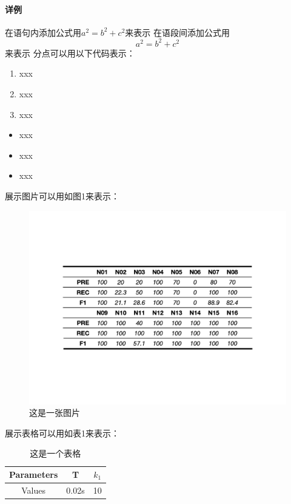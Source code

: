 \documentclass[12pt]{article}
\begin{document}
\paragraph{\songti{}详例}
\clearpage
\songti{}在语句内添加公式用$a^2=b^2+c^2$来表示
\songti{}在语段间添加公式用$$a^2=b^2+c^2$$来表示
\clearpage
\songti{}分点可以用以下代码表示：
\begin{enumerate}
    \songti{}\item xxx
    \songti{}\item xxx
    \songti{}\item xxx
\end{enumerate}
\begin{itemize}
    \songti{}\item xxx
    \songti{}\item xxx
    \songti{}\item xxx
\end{itemize}
\clearpage
\songti{}展示图片可以用如图1来表示：
\begin{figure}[H]
    \label{fig:图片}
    \centering
    \includegraphics[scale=0.5,trim=150 220 150 220,clip]{图片.jpeg}
    \caption{\fangsong 这是一张图片}
\end{figure}
\clearpage
\songti{}展示表格可以用如表1来表示：
\begin{table}[H]
    \centering
    \begin{tabular}{ccc}
        \hline
        Parameters & T & $k_1$ \\ 
        \hline
        Values & 0.02s & 10 \\ 
        \hline
    \end{tabular}
    \caption{\fangsong 这是一个表格}
\end{table}
\end{document}
